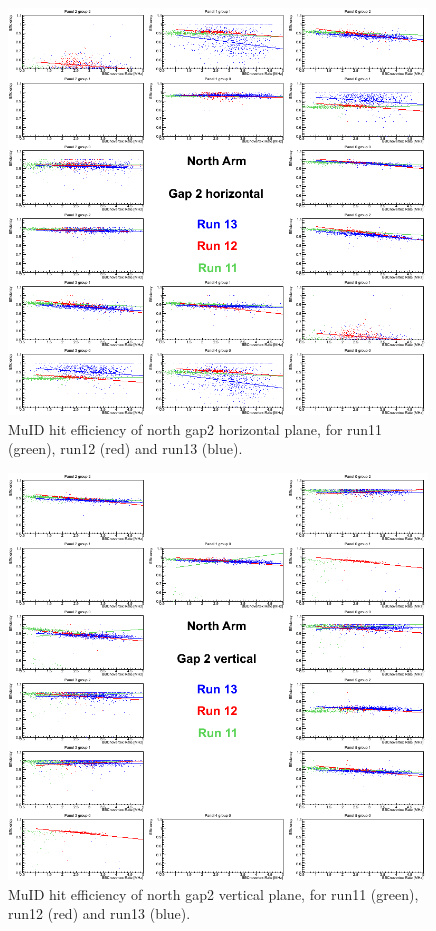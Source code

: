 \begin{center}
  \begin{figure}[p]
    \includegraphics[width=0.99\textwidth]{./figures/efficomp_North_gap2_horizontal.png}
    \caption{\label{Fig:efficiency:MuIdEff:a1g2p0}MuID hit efficiency of north gap2 horizontal plane, for run11 (green), run12 (red) and run13 (blue).}
  \end{figure}
\end{center}
\begin{center}
  \begin{figure}[p]
    \includegraphics[width=0.99\textwidth]{./figures/efficomp_North_gap2_vertical.png}
    \caption{\label{Fig:efficiency:MuIdEff:a1g2p1}MuID hit efficiency of north gap2 vertical plane, for run11 (green), run12 (red) and run13 (blue).}
  \end{figure}
\end{center}

